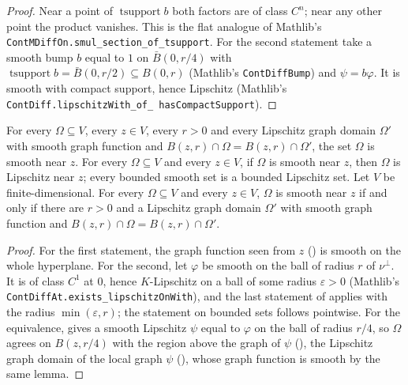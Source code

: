 \begin{proof}
\leanok
Near a point of $\operatorname{tsupport} b$ both factors are of class $C^n$; near any other point
the product vanishes. This is the flat analogue of Mathlib's
\texttt{ContMDiffOn.\allowbreak smul\_\allowbreak section\_\allowbreak of\_\allowbreak tsupport}.
For the second statement take a smooth bump $b$ equal to $1$ on
$\bar B(0, r/4)$ with $\operatorname{tsupport} b = \bar B(0, r/2) \subseteq B(0, r)$ (Mathlib's
\texttt{ContDiffBump}) and $\psi = b \varphi$. It is smooth with compact support, hence Lipschitz
(Mathlib's \texttt{ContDiff.\allowbreak lipschitzWith\_\allowbreak of\_\allowbreak
hasCompactSupport}).
\end{proof}

\begin{theorem}
\label{thm:smooth-near-point}
\leanok
{}
For every $\Omega \subseteq V$, every $z \in V$, every $r > 0$ and every Lipschitz graph domain
$\Omega'$ with smooth graph function and $B(z, r) \cap \Omega = B(z, r) \cap \Omega'$, the set
$\Omega$ is smooth near $z$. For every $\Omega \subseteq V$ and every $z \in V$, if $\Omega$ is
smooth near $z$, then $\Omega$ is Lipschitz near $z$; every bounded smooth set is a bounded
Lipschitz set. Let $V$ be finite-dimensional. For every $\Omega \subseteq V$ and every $z \in V$,
$\Omega$ is smooth near $z$ if and only if there are $r > 0$ and a Lipschitz graph domain
$\Omega'$ with smooth graph function and $B(z, r) \cap \Omega = B(z, r) \cap \Omega'$.
\end{theorem}

\begin{proof}
\leanok
For the first statement, the graph function seen from $z$ () is
smooth on the whole hyperplane. For the second, let $\varphi$ be smooth on the ball of radius $r$
of $\nu^\perp$. It is of class $C^1$ at $0$, hence $K$-Lipschitz on a ball of some radius
$\varepsilon > 0$ (Mathlib's \texttt{ContDiffAt.\allowbreak exists\_\allowbreak lipschitzOnWith}),
and the last statement of  applies with the radius
$\min(\varepsilon, r)$; the statement on bounded sets follows pointwise. For the equivalence,
 gives a smooth Lipschitz $\psi$ equal to $\varphi$ on the ball of radius
$r/4$, so $\Omega$ agrees on $B(z, r/4)$ with the region above the graph of $\psi$
(), the Lipschitz graph domain of the local graph $\psi$
(), whose graph function is smooth by the same lemma.
\end{proof}

